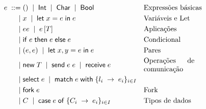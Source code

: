 \begin{figure}
  \begin{align*}
    e \grmeq & \unite \grmor \inte \grmor \chare \grmor \boole && \text{Expressões básicas}\\
    \grmor & \vare{x} \grmor \unlete{x}{e}{e} && \text{Variáveis e Let}\\
    \grmor & \appe{e}{e} \grmor \tappe{e}{T} && \text{Aplicações}\\
    \grmor & \conditionale{e}{e}{e} && \text{Condicional}\\
    \grmor & \paire{e}{e} \grmor \binlete{x}{y}{e}{e} && \text{Pares}\\
    \grmor & \newe{T} \grmor \sende{e}{e} \grmor \recve{e} && \text{\parbox{2.5cm}{Operações de comunicação}}\\
    \grmor & \selecte{e} \grmor \matche{e}{\{l_i\;\to\;e_i\}_{i\in I}} \\
    \grmor & \forke{e}  && \text{Fork}\\
    \grmor & \ctrcte \grmor \casee{e}{\{C_i\;\to\;e_i\}_{i\in I}} && \text{Tipos de dados}
  \end{align*}
\end{figure}



